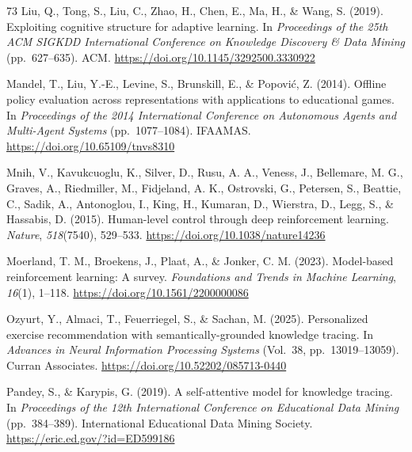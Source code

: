 \documentclass[a4paper,preprint,12pt,authoryear]{elsarticle}
\begin{document}
\begin{thebibliography}{73}
Liu, Q., Tong, S., Liu, C., Zhao, H., Chen, E., Ma, H., \& Wang, S. (2019). Exploiting cognitive structure for adaptive learning. In \textit{Proceedings of the 25th ACM SIGKDD International Conference on Knowledge Discovery \& Data Mining} (pp.~627--635). ACM. \url{https://doi.org/10.1145/3292500.3330922}

Mandel, T., Liu, Y.-E., Levine, S., Brunskill, E., \& Popovi{\'c}, Z. (2014). Offline policy evaluation across representations with applications to educational games. In \textit{Proceedings of the 2014 International Conference on Autonomous Agents and Multi-Agent Systems} (pp.~1077--1084). IFAAMAS. \url{https://doi.org/10.65109/tnvs8310}

Mnih, V., Kavukcuoglu, K., Silver, D., Rusu, A. A., Veness, J., Bellemare, M. G., Graves, A., Riedmiller, M., Fidjeland, A. K., Ostrovski, G., Petersen, S., Beattie, C., Sadik, A., Antonoglou, I., King, H., Kumaran, D., Wierstra, D., Legg, S., \& Hassabis, D. (2015). Human-level control through deep reinforcement learning. \textit{Nature}, \textit{518}(7540), 529--533. \url{https://doi.org/10.1038/nature14236}

Moerland, T. M., Broekens, J., Plaat, A., \& Jonker, C. M. (2023). Model-based reinforcement learning: A survey. \textit{Foundations and Trends in Machine Learning}, \textit{16}(1), 1--118. \url{https://doi.org/10.1561/2200000086}

Ozyurt, Y., Almaci, T., Feuerriegel, S., \& Sachan, M. (2025). Personalized exercise recommendation with semantically-grounded knowledge tracing. In \textit{Advances in Neural Information Processing Systems} (Vol.~38, pp.~13019--13059). Curran Associates. \url{https://doi.org/10.52202/085713-0440}

Pandey, S., \& Karypis, G. (2019). A self-attentive model for knowledge tracing. In \textit{Proceedings of the 12th International Conference on Educational Data Mining} (pp.~384--389). International Educational Data Mining Society. \url{https://eric.ed.gov/?id=ED599186}


\end{thebibliography}
\end{document}
